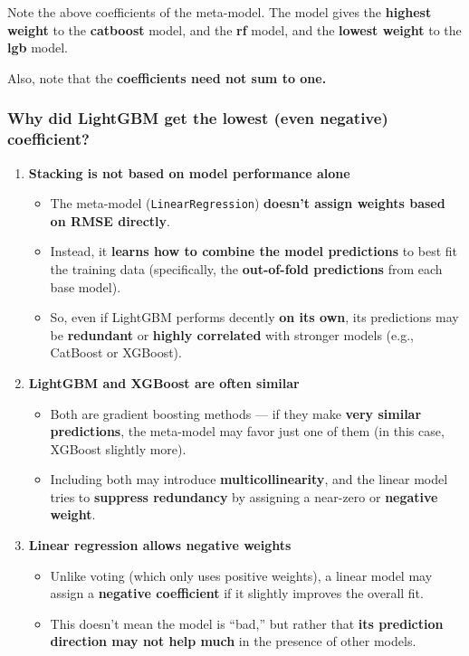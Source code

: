 \documentclass[
  letterpaper,
  DIV=11,
  numbers=noendperiod]{scrreprt}
\providecommand{\tightlist}{%
  \setlength{\itemsep}{0pt}\setlength{\parskip}{0pt}}\usepackage{longtable,booktabs,array}
\begin{document}
Note the above coefficients of the meta-model. The model gives the
\textbf{highest weight} to the \textbf{catboost} model, and the
\textbf{rf} model, and the \textbf{lowest weight} to the \textbf{lgb}
model.

Also, note that the \textbf{coefficients need not sum to one.}

\subsubsection{Why did LightGBM get the lowest (even negative)
coefficient?}\label{why-did-lightgbm-get-the-lowest-even-negative-coefficient}

\begin{enumerate}
\def\labelenumi{\arabic{enumi}.}
\tightlist
\item
  \textbf{Stacking is not based on model performance alone}

  \begin{itemize}
  \tightlist
  \item
    The meta-model (\texttt{LinearRegression}) \textbf{doesn't assign
    weights based on RMSE directly}.
  \item
    Instead, it \textbf{learns how to combine the model predictions} to
    best fit the training data (specifically, the \textbf{out-of-fold
    predictions} from each base model).
  \item
    So, even if LightGBM performs decently \textbf{on its own}, its
    predictions may be \textbf{redundant} or \textbf{highly correlated}
    with stronger models (e.g., CatBoost or XGBoost).
  \end{itemize}
\item
  \textbf{LightGBM and XGBoost are often similar}

  \begin{itemize}
  \tightlist
  \item
    Both are gradient boosting methods --- if they make \textbf{very
    similar predictions}, the meta-model may favor just one of them (in
    this case, XGBoost slightly more).
  \item
    Including both may introduce \textbf{multicollinearity}, and the
    linear model tries to \textbf{suppress redundancy} by assigning a
    near-zero or \textbf{negative weight}.
  \end{itemize}
\item
  \textbf{Linear regression allows negative weights}

  \begin{itemize}
  \tightlist
  \item
    Unlike voting (which only uses positive weights), a linear model may
    assign a \textbf{negative coefficient} if it slightly improves the
    overall fit.
  \item
    This doesn't mean the model is ``bad,'' but rather that \textbf{its
    prediction direction may not help much} in the presence of other
    models.
  \end{itemize}
\end{enumerate}
\end{document}
